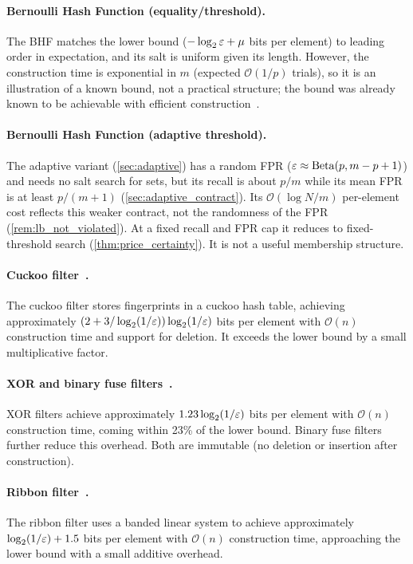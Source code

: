 \paragraph{Bernoulli Hash Function (equality/threshold).}
The BHF matches the lower bound ($-\log_2 \varepsilon + \mu$ bits per element) to
leading order in expectation, and its salt is uniform given its length.
However, the construction time is exponential in $m$ (expected
$\mathcal{O}(1/p)$ trials), so it is an illustration of a known bound, not a
practical structure; the bound was already known to be achievable with
efficient construction~\cite{pagh2005,dietzfelbinger2008retrieval}.

\paragraph{Bernoulli Hash Function (adaptive threshold).}
The adaptive variant (\cref{sec:adaptive}) has a random FPR
($\varepsilon \approx \operatorname{Beta}(p, m - p + 1)$) and needs no salt search for sets,
but its recall is about $p/m$ while its mean FPR is at least $p/(m+1)$
(\cref{sec:adaptive_contract}).
Its $\mathcal{O}(\log N / m)$ per-element cost reflects this weaker contract,
not the randomness of the FPR (\cref{rem:lb_not_violated}).
At a fixed recall and FPR cap it reduces to fixed-threshold search
(\cref{thm:price_certainty}).
It is not a useful membership structure.

\paragraph{Cuckoo filter~\cite{cuckoo_filter}.}
The cuckoo filter stores fingerprints in a cuckoo hash table, achieving
approximately $(2 + 3/\log_2(1/\varepsilon)) \log_2(1/\varepsilon)$ bits per element
with $\mathcal{O}(n)$ construction time and support for deletion.
It exceeds the lower bound by a small multiplicative factor.

\paragraph{XOR and binary fuse filters~\cite{xor_filter}.}
XOR filters achieve approximately $1.23 \log_2(1/\varepsilon)$ bits per element
with $\mathcal{O}(n)$ construction time, coming within 23\% of the lower bound.
Binary fuse filters further reduce this overhead.
Both are immutable (no deletion or insertion after construction).

\paragraph{Ribbon filter~\cite{ribbon_filter}.}
The ribbon filter uses a banded linear system to achieve approximately
$\log_2(1/\varepsilon) + 1.5$ bits per element with $\mathcal{O}(n)$ construction
time, approaching the lower bound with a small additive overhead.

